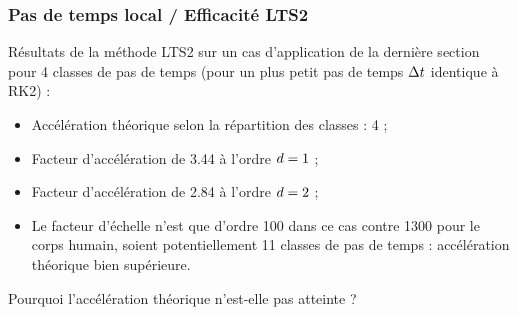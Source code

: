 \begin{frame}
\frametitle{Pas de temps local / Efficacité LTS2}
\vfill
Résultats de la méthode LTS2 sur un cas d'application de la dernière section pour 4 classes de pas de temps (pour un plus petit pas de temps $\Delta t$ identique à RK2) :
\begin{itemize}
\item Accélération théorique selon la répartition des classes : 4 ;
\vfill
\item Facteur d'accélération de 3.44 à l'ordre $d = 1$ ;
\item Facteur d'accélération de 2.84 à l'ordre $d = 2$ ;
\vfill
\item Le facteur d'échelle n'est que d'ordre 100 dans ce cas contre 1300 pour le corps humain, soient potentiellement 11 classes de pas de temps : accélération théorique bien supérieure.
\end{itemize}
\vfill
Pourquoi l'accélération théorique n'est-elle pas atteinte ?
\vfill
\end{frame}

